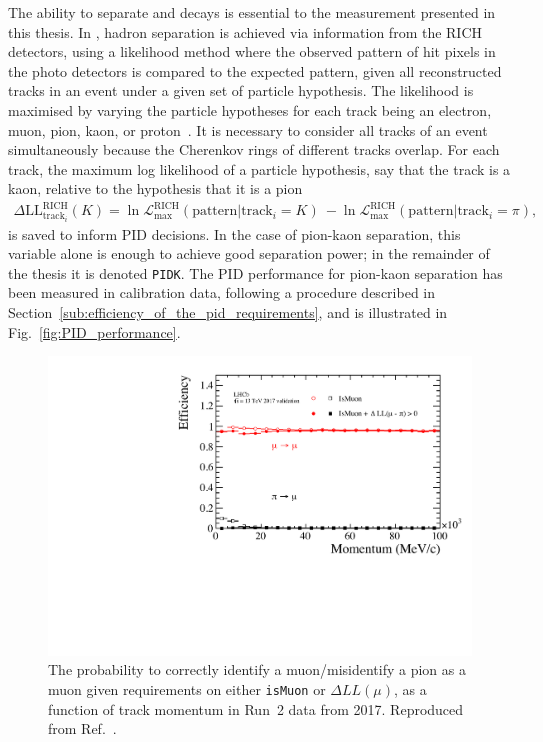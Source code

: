 The ability to separate \BtoDK and \BtoDpi decays is essential to the measurement presented in this thesis. In \lhcb, hadron separation is achieved via information from the RICH detectors, using a likelihood method where the observed pattern of hit pixels in the photo detectors is compared to the expected pattern, given all reconstructed tracks in an event under a given set of particle hypothesis. The likelihood is maximised by varying the particle hypotheses for each track being an electron, muon, pion, kaon, or proton~\cite{Forty:684714}.  It is necessary to consider all tracks of an event simultaneously because the Cherenkov rings of different tracks overlap. For each track, the maximum log likelihood of a particle hypothesis, say that the track is a kaon, relative to the hypothesis that it is a pion
\begin{align}\label{eq:DLL}
    \Delta\text{LL}_{\text{track}_i}^\text{RICH}(K) =  \ln \mathcal L_\text{max}^\text{RICH}(\text{pattern}|\text{track}_i = K)\ - \ln \mathcal L_\text{max}^\text{RICH}(\text{pattern}|\text{track}_i = \pi),
\end{align}
is saved to inform PID decisions. In the case of pion-kaon separation, this variable alone is enough to achieve good separation power; in the remainder of the thesis it is denoted \texttt{PIDK}. The PID performance for pion-kaon separation has been measured in calibration data, following a procedure described in Section~\ref{sub:efficiency_of_the_pid_requirements}, and is illustrated in Fig.~\ref{fig:PID_performance}.

\begin{figure}[tb]
    \centering
    \includegraphics[width=0.60\columnwidth]{figures/detector/PIDmu_Run2.pdf}
    \caption{The probability to correctly identify a muon/misidentify a pion as a muon given requirements on either \texttt{isMuon} or $\Delta LL(\mu)$, as a function of track momentum in Run~2 data from 2017. Reproduced from Ref.~\cite{PIDplots}.}
    \label{fig:PIDmu_performance}
\end{figure}

